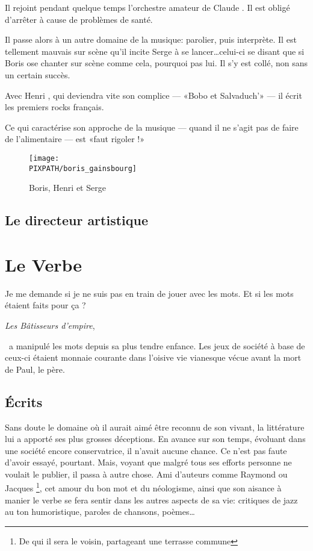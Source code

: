 Il rejoint pendant quelque temps l'orchestre amateur
de Claude . Il est obligé d'arrêter à cause
de problèmes de santé.

Il passe alors à un autre domaine de la musique: parolier, puis interprète. Il est tellement
mauvais sur scène qu'il incite Serge   à se lancer\ldots celui-ci se disant
que si Boris ose chanter sur scène comme cela, pourquoi pas lui. Il s'y est collé, non sans
un certain succès.

Avec Henri , qui deviendra vite son complice --- «Bobo et Salvaduch'» --- il
écrit les premiers rocks français.

Ce qui caractérise son approche de la musique --- quand il ne s'agit pas de faire de
l'alimentaire --- est «faut rigoler !»


\begin{figure}
\centering
\texttt{[image: \\PIXPATH/boris\_gainsbourg]}
\caption{Boris, Henri et Serge}
\end{figure}

\subsection{Le directeur artistique}

\section{Le Verbe}
\epigraph{Je me demande si je ne suis pas en train de jouer avec les mots. Et si les mots étaient faits pour ça ?}
{\emph{Les Bâtisseurs d'empire}, \BV}

\BV\ a manipulé les mots depuis sa plus tendre enfance. Les jeux de société à base
de ceux-ci étaient monnaie courante dans l'oisive vie vianesque vécue avant la mort
de Paul, le père.

\subsection{Écrits}

Sans doute le domaine où il aurait aimé être reconnu de son vivant, la littérature lui a apporté
ses plus grosses déceptions. En avance sur son temps, évoluant dans une société encore conservatrice,
il n'avait aucune chance. Ce n'est pas faute d'avoir essayé, pourtant. Mais, voyant que malgré tous
ses efforts personne ne voulait le publier, il passa à autre chose.
Ami d'auteurs comme Raymond  ou Jacques \footnote{De qui il sera le voisin, partageant une
terrasse commune}, cet amour du bon mot et du néologisme, ainsi que son aisance à manier
le verbe se fera sentir dans les autres aspects de sa vie: critiques de jazz au ton humoristique, paroles de chansons,
poèmes\ldots

